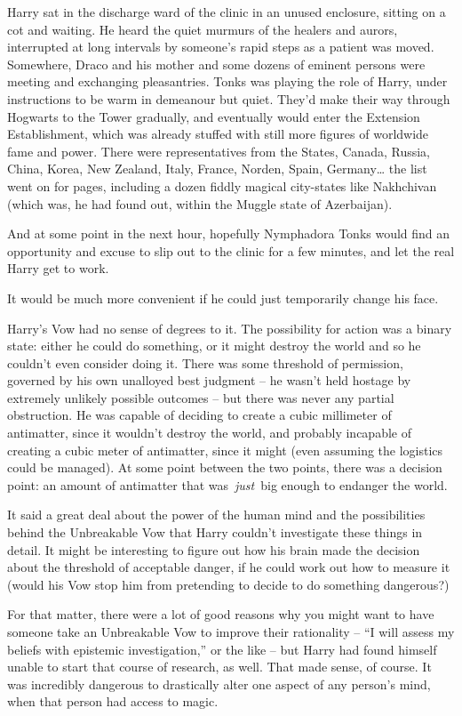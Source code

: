 Harry sat in the discharge ward of the clinic in an unused enclosure,
sitting on a cot and waiting. He heard the quiet murmurs of the healers
and aurors, interrupted at long intervals by someone's rapid steps as a
patient was moved. Somewhere, Draco and his mother and some dozens of
eminent persons were meeting and exchanging pleasantries. Tonks was
playing the role of Harry, under instructions to be warm in demeanour
but quiet. They'd make their way through Hogwarts to the Tower
gradually, and eventually would enter the Extension Establishment, which
was already stuffed with still more figures of worldwide fame and power.
There were representatives from the States, Canada, Russia, China,
Korea, New Zealand, Italy, France, Norden, Spain, Germany\ldots{} the
list went on for pages, including a dozen fiddly magical city-states
like Nakhchivan (which was, he had found out, within the Muggle state of
Azerbaijan).

And at some point in the next hour, hopefully Nymphadora Tonks would
find an opportunity and excuse to slip out to the clinic for a few
minutes, and let the real Harry get to work.

It would be much more convenient if he could just temporarily change his
face.

Harry's Vow had no sense of degrees to it. The possibility for action
was a binary state: either he could do something, or it might destroy
the world and so he couldn't even consider doing it. There was some
threshold of permission, governed by his own unalloyed best judgment --
he wasn't held hostage by extremely unlikely possible outcomes -- but
there was never any partial obstruction. He was capable of deciding to
create a cubic millimeter of antimatter, since it wouldn't destroy the
world, and probably incapable of creating a cubic meter of antimatter,
since it might (even assuming the logistics could be managed). At some
point between the two points, there was a decision point: an amount of
antimatter that was~\emph{just}~big enough to endanger the world.

It said a great deal about the power of the human mind and the
possibilities behind the Unbreakable Vow that Harry couldn't investigate
these things in detail. It might be interesting to figure out how his
brain made the decision about the threshold of acceptable danger, if he
could work out how to measure it (would his Vow stop him from pretending
to decide to do something dangerous?)

For that matter, there were a lot of good reasons why you might want to
have someone take an Unbreakable Vow to improve their rationality -- ``I
will assess my beliefs with epistemic investigation,'' or the like --
but Harry had found himself unable to start that course of research, as
well. That made sense, of course. It was incredibly dangerous to
drastically alter one aspect of any person's mind, when that person had
access to magic.

